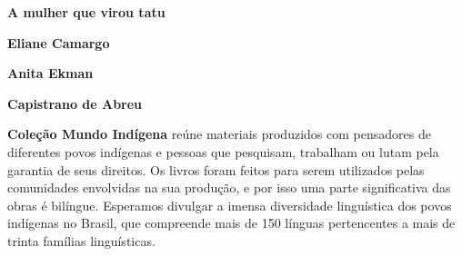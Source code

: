 \textbf{A mulher que virou tatu} \lipsum[1]

\textbf{Eliane Camargo} \lipsum[2]

\textbf{Anita Ekman} \lipsum[2]

\textbf{Capistrano de Abreu} \lipsum[2]

\textbf{Coleção Mundo Indígena} reúne materiais produzidos com pensadores de diferentes povos indígenas e pessoas que pesquisam, trabalham ou lutam pela garantia de seus direitos. Os livros foram feitos para serem utilizados pelas comunidades envolvidas na sua produção, e por isso uma parte significativa das obras é bilíngue. Esperamos divulgar a imensa diversidade linguística dos povos indígenas no Brasil, que compreende mais de 150 línguas pertencentes a mais de trinta famílias linguísticas.



